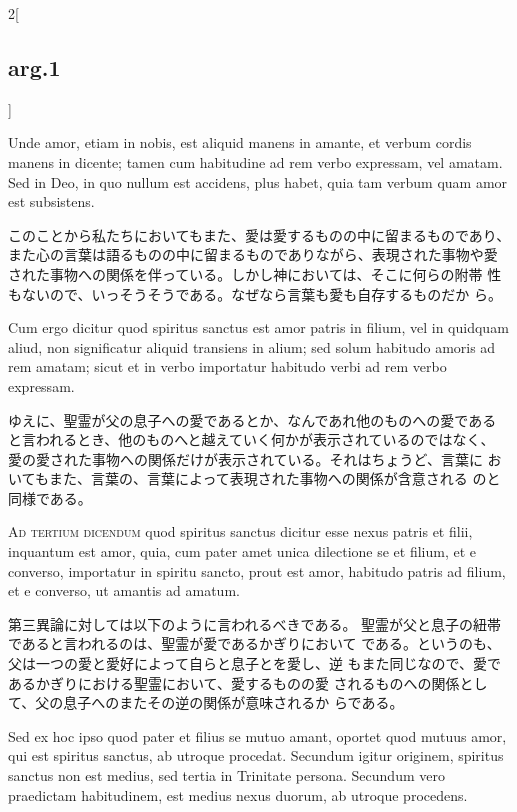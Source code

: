 \documentclass[paper=a4paper,fontsize=10pt,jafontsize=9pt,titlepage]{jlreq}
\begin{document}
\begin{paracol}{2}[\subsection{arg.1}]
\switchcolumn*

Unde amor,
etiam in nobis, est aliquid manens in amante, et verbum cordis manens
in dicente; tamen cum habitudine ad rem verbo expressam, vel
amatam. Sed in Deo, in quo nullum est accidens, plus habet, quia tam
verbum quam amor est subsistens.

\switchcolumn

このことから私たちにおいてもまた、愛は愛するものの中に留まるものであり、
また心の言葉は語るものの中に留まるものでありながら、表現された事物や愛
 された事物への関係を伴っている。しかし神においては、そこに何らの附帯
 性もないので、いっそうそうである。なぜなら言葉も愛も自存するものだか
 ら。

\switchcolumn*

Cum ergo dicitur quod spiritus
sanctus est amor patris in filium, vel in quidquam aliud, non
significatur aliquid transiens in alium; sed solum habitudo amoris ad
rem amatam; sicut et in verbo importatur habitudo verbi ad rem verbo
expressam.

\switchcolumn

ゆえに、聖霊が父の息子への愛であるとか、なんであれ他のものへの愛である
 と言われるとき、他のものへと越えていく何かが表示されているのではなく、
 愛の愛された事物への関係だけが表示されている。それはちょうど、言葉に
 おいてもまた、言葉の、言葉によって表現された事物への関係が含意される
 のと同様である。

\switchcolumn*[\subsection{ad.3}]

{\scshape Ad tertium dicendum} quod spiritus sanctus dicitur esse nexus patris et
filii, inquantum est amor, quia, cum pater amet unica dilectione se et
filium, et e converso, importatur in spiritu sancto, prout est amor,
habitudo patris ad filium, et e converso, ut amantis ad amatum.

\switchcolumn

第三異論に対しては以下のように言われるべきである。
聖霊が父と息子の紐帯であると言われるのは、聖霊が愛であるかぎりにおいて
 である。というのも、父は一つの愛と愛好によって自らと息子とを愛し、逆
 もまた同じなので、愛であるかぎりにおける聖霊において、愛するものの愛
 されるものへの関係として、父の息子へのまたその逆の関係が意味されるか
 らである。

\switchcolumn*

Sed ex
hoc ipso quod pater et filius se mutuo amant, oportet quod mutuus
amor, qui est spiritus sanctus, ab utroque procedat. Secundum igitur
originem, spiritus sanctus non est medius, sed tertia in Trinitate
persona. Secundum vero praedictam habitudinem, est medius nexus
duorum, ab utroque procedens.


\end{paracol}
\end{document}
